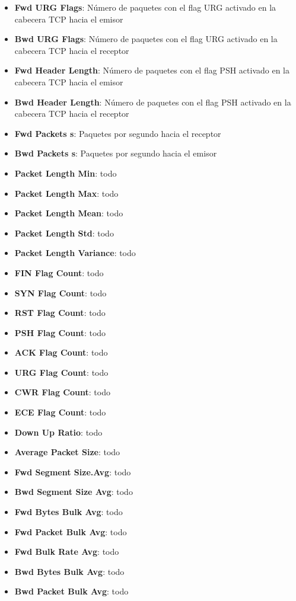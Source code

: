 \begin{itemize}
    \item \textbf{Fwd URG Flags}: Número de paquetes con el flag URG activado en la cabecera TCP hacia el emisor
    \item \textbf{Bwd URG Flags}: Número de paquetes con el flag URG activado en la cabecera TCP hacia el receptor
    \item \textbf{Fwd Header Length}: Número de paquetes con el flag PSH activado en la cabecera TCP hacia el emisor
    \item \textbf{Bwd Header Length}: Número de paquetes con el flag PSH activado en la cabecera TCP hacia el receptor
    \item \textbf{Fwd Packets s}: Paquetes por segundo hacia el receptor
    \item \textbf{Bwd Packets s}: Paquetes por segundo hacia el emisor
    \item \textbf{Packet Length Min}: todo
    \item \textbf{Packet Length Max}: todo
    \item \textbf{Packet Length Mean}: todo
    \item \textbf{Packet Length Std}: todo
    \item \textbf{Packet Length Variance}: todo
    \item \textbf{FIN Flag Count}: todo
    \item \textbf{SYN Flag Count}: todo
    \item \textbf{RST Flag Count}: todo
    \item \textbf{PSH Flag Count}: todo
    \item \textbf{ACK Flag Count}: todo
    \item \textbf{URG Flag Count}: todo
    \item \textbf{CWR Flag Count}: todo
    \item \textbf{ECE Flag Count}: todo
    \item \textbf{Down Up Ratio}: todo
    \item \textbf{Average Packet Size}: todo
    \item \textbf{Fwd Segment Size.Avg}: todo
    \item \textbf{Bwd Segment Size Avg}: todo
    \item \textbf{Fwd Bytes Bulk Avg}: todo
    \item \textbf{Fwd Packet Bulk Avg}: todo
    \item \textbf{Fwd Bulk Rate Avg}: todo
    \item \textbf{Bwd Bytes Bulk Avg}: todo
    \item \textbf{Bwd Packet Bulk Avg}: todo

\end{itemize}
